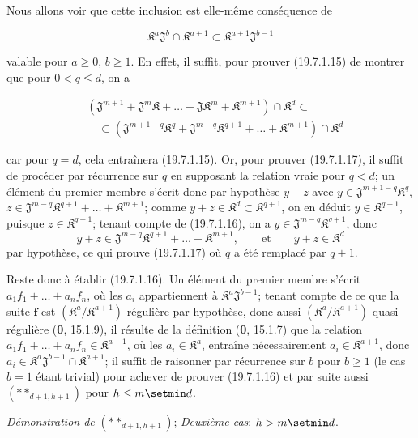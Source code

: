 Nous allons voir que cette inclusion est elle-même conséquence de
\begin{env}[19.7.1.16]
\label{IV.19.7.1.16}
\[
  \mathfrak K^a\mathfrak J^b\cap\mathfrak K^{a+1}\subset\mathfrak K^{a+1}\mathfrak J^{b-1}
\]
\end{env}
valable pour $a\geq0$, $b\geq1$. En effet, il suffit, pour prouver (19.7.1.15) de montrer que pour $0<q\leq d$, on a
\begin{env}[19.7.1.17]
\label{IV.19.7.1.17}
\[
\begin{aligned}
  &(\mathfrak J^{m+1}+\mathfrak J^m\mathfrak K+\ldots+\mathfrak J\mathfrak K^m+\mathfrak K^{m+1})\cap\mathfrak K^d\subset\\
  &\quad\subset(\mathfrak J^{m+1-q}\mathfrak K^q+\mathfrak J^{m-q}\mathfrak K^{q+1}+\ldots+\mathfrak K^{m+1})\cap\mathfrak K^d
\end{aligned}
\]
\end{env}
car pour $q=d$, cela entraînera (19.7.1.15). Or, pour prouver (19.7.1.17), il suffit de procéder par récurrence sur $q$ en supposant la relation vraie pour $q<d$; un élément du premier membre s'écrit donc par hypothèse $y+z$ avec $y\in\mathfrak J^{m+1-q}\mathfrak K^q$, $z\in\mathfrak J^{m-q}\mathfrak K^{q+1}+\ldots+\mathfrak K^{m+1}$; comme $y+z\in\mathfrak K^d\subset\mathfrak K^{q+1}$, on en déduit $y\in\mathfrak K^{q+1}$, puisque $z\in\mathfrak K^{q+1}$; tenant compte de (19.7.1.16), on a $y\in\mathfrak J^{m-q}\mathfrak K^{q+1}$, donc
\[
  y+z\in\mathfrak J^{m-q}\mathfrak K^{q+1}+\ldots+\mathfrak K^{m+1},\qquad\text{et}\qquad y+z\in\mathfrak K^d
\]
par hypothèse, ce qui prouve (19.7.1.17) où $q$ a été remplacé par $q+1$.

Reste donc à établir (19.7.1.16). Un élément du premier membre s'écrit $a_1f_1+\ldots+a_nf_n$, où les $a_i$ appartiennent à $\mathfrak K^a\mathfrak J^{b-1}$; tenant compte de ce que la suite $\mathbf f$ est $(\mathfrak K^a/\mathfrak K^{a+1})$-régulière par hypothèse, donc aussi $(\mathfrak K^a/\mathfrak K^{a+1})$-quasi-régulière (\textbf{0}, 15.1.9), il résulte de la définition (\textbf{0}, 15.1.7) que la relation $a_1f_1+\ldots+a_nf_n\in\mathfrak K^{a+1}$, où les $a_i\in\mathfrak K^a$, entraîne nécessairement $a_i\in\mathfrak K^{a+1}$, donc $a_i\in\mathfrak K^a\mathfrak J^{b-1}\cap\mathfrak K^{a+1}$; il suffit de raisonner par
récurrence sur $b$ pour $b\geq1$ (le cas $b=1$ étant trivial) pour achever de prouver (19.7.1.16) et par suite aussi $(**_{d+1,h+1})$ pour $h\leq m\setmin d$.

\begin{env}[19.7.1.18]
\label{IV.19.7.1.18}
\emph{Démonstration de} $(**_{d+1,h+1})$; \emph{Deuxième cas}: $h>m\setmin d$.
\end{env}

